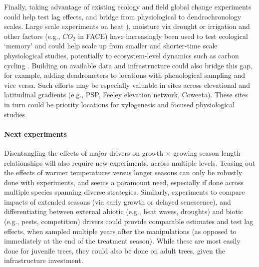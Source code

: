 \documentclass[11pt]{article}
\begin{document}
Finally, taking advantage of existing ecology and field global change experiments could help test lag effects, and bridge from physiological to dendrochronology scales. Large scale experiments on heat \citep[e.g., SPRUCE][]{hanson2017attaining}), moisture via drought or irrigation \citep[e.g., DroughtNet, Phynwald][]{smith2016drought} and other factors (e.g., $CO_2$ in FACE) have increasingly been used to test ecological `memory' \citep[e.g., ][]{flinker2021promise, schweiger2022transgenerational} and could help scale up from smaller and shorter-time scale physiological studies, potentially to ecosystem-level dynamics such as carbon cycling \citep{ding2021plant, jensen2019simulated}. Building on available data and infrastructure could also bridge this gap, for example, adding dendrometers to locations with phenological sampling and vice versa. Such efforts may be especially valuable in sites across elevational and latitudinal gradients (e.g., PSP, Feeley elevation network, Coweeta). These sites in turn could be priority locations for xylogenesis and focused physiological studies. 

\paragraph{Next experiments}

Disentangling the effects of major drivers on growth $\times$ growing season length relationships will also require new experiments, across multiple levels. Teasing out the effects of warmer temperatures versus longer seasons can only be robustly done with experiments, and seems a paramount need, especially if done across multiple species spanning diverse strategies. Similarly, experiments to compare impacts of extended seasons (via early growth or delayed senescence), and differentiating between external abiotic (e.g., heat waves, droughts) and biotic (e.g., pests, competition) drivers could provide comparable estimates and test lag effects, when sampled multiple years after the manipulations (as opposed to immediately at the end of the treatment season). While these are most easily done for juvenile trees, they could also be done on adult trees, given the infrastructure investment. %
\end{document}
